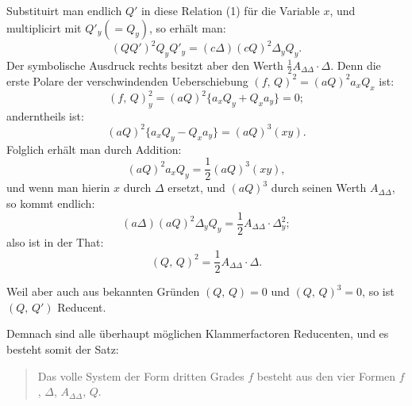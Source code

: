 \documentclass[11pt]{article}
\providecommand{\weberpage}[1]{}
\providecommand{\weq}[2]{\begin{equation}\tag{#1}#2\end{equation}}
\let\Delta\varDelta
\begin{document}
Substituirt man endlich $Q'$ in diese Relation (1) für die Variable $x$, und multiplicirt mit $Q'_y (= Q_y)$, so erhält man:
\[
(QQ')^2 Q_y Q'_y = (c\Delta)(cQ)^2 \Delta_y Q_y.
\]
Der symbolische Ausdruck rechts besitzt aber den Werth $\frac{1}{2}A_{\Delta\Delta}\cdot\Delta$. Denn die erste Polare der verschwindenden Ueberschiebung $(f,\,Q)^2 = (aQ)^2 a_x Q_x$ ist:
\[
(f,\,Q)_y^2 = (aQ)^2\{a_x Q_y + Q_x a_y\} = 0;
\]
anderntheils ist:
\[
(aQ)^2\{a_x Q_y - Q_x a_y\} = (aQ)^3(xy).
\]
Folglich erhält man durch Addition:
\[
(aQ)^2 a_x Q_y = \frac{1}{2}(aQ)^3(xy),
\]
und wenn man hierin $x$ durch $\Delta$ ersetzt, und $(aQ)^3$ durch seinen Werth $A_{\Delta\Delta}$, so kommt endlich:
\[
(a\Delta)(aQ)^2 \Delta_y Q_y = \frac{1}{2}A_{\Delta\Delta}\cdot \Delta_y^2;
\]
also ist in der That:
\weq{VI}{(Q,\,Q)^2 = \frac{1}{2}A_{\Delta\Delta}\cdot \Delta.}


\weberpage{172}
Weil aber auch aus bekannten Gründen $(Q,\,Q) = 0$ und $(Q,\,Q)^3 = 0$, so ist $(Q,\,Q')$ Reducent.

Demnach sind alle überhaupt möglichen Klammerfactoren Reducenten, und es besteht somit der Satz:

\begin{quote}
\glqq Das volle System der Form dritten Grades $f$ besteht aus den vier Formen $f$, $\Delta$, $A_{\Delta\Delta}$, $Q$.\grqq{}
\end{quote}
\end{document}
